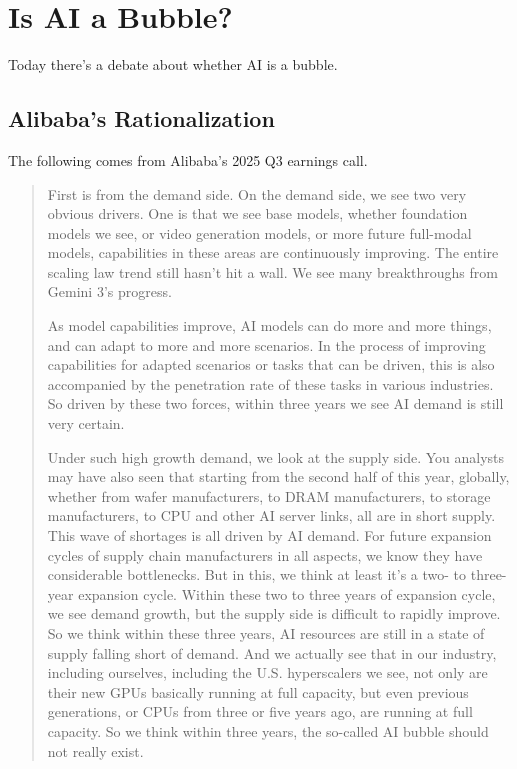 \chapter{Is AI a Bubble?}

Today there's a debate about whether AI is a bubble.
\section{Alibaba's Rationalization}

The following comes from Alibaba's 2025 Q3 earnings call.
\begin{quote}
First is from the demand side. On the demand side, we see two very obvious drivers. One is that we
see base models, whether foundation models we see, or video generation models, or more future full-modal
models, capabilities in these areas are continuously improving. The entire scaling law trend still hasn’t hit a
wall. We see many breakthroughs from Gemini 3’s progress.

As model capabilities improve, AI models can do more and more things, and can adapt to more and
more scenarios. In the process of improving capabilities for adapted scenarios or tasks that can be driven,
this is also accompanied by the penetration rate of these tasks in various industries. So driven by these two
forces, within three years we see AI demand is still very certain.

Under such high growth demand, we look at the supply side. You analysts may have also seen that starting
from the second half of this year, globally, whether from wafer manufacturers, to DRAM manufacturers, to
storage manufacturers, to CPU and other AI server links, all are in short supply. This wave of shortages is
all driven by AI demand. For future expansion cycles of supply chain manufacturers in all aspects, we know
they have considerable bottlenecks. But in this, we think at least it’s a two- to three-year expansion cycle.
Within these two to three years of expansion cycle, we see demand growth, but the supply side is difficult to
rapidly improve. So we think within these three years, AI resources are still in a state of supply falling short
of demand. And we actually see that in our industry, including ourselves, including the U.S. hyperscalers we
see, not only are their new GPUs basically running at full capacity, but even previous generations, or CPUs
from three or five years ago, are running at full capacity. So we think within three years, the so-called AI
bubble should not really exist.
\end{quote}

